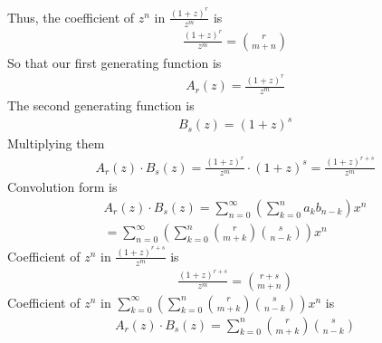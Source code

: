 ﻿\documentclass{article}
\begin{document}
    Thus, the coefficient of $z^n$ in $\frac{(1+z)^{r}}{z^m}$ is
    \begin{align*}
    [z^n]
        \frac{(1+z)^{r}}{z^m} = \binom{r}{m+n}
    \end{align*}
    So that our first generating function is
    \begin{align*}
        A_r(z) = \frac{(1+z)^{r}}{z^m}
    \end{align*}
    The second generating function is
    \begin{align*}
        B_s(z) = (1+z)^{s}
    \end{align*}
    Multiplying them
    \begin{align*}
        A_r(z) \cdot B_s(z) = \frac{(1+z)^{r}}{z^m} \cdot (1+z)^{s} = \frac{(1+z)^{r+s}}{z^m}
    \end{align*}
    Convolution form is
    \begin{align*}
        A_r(z) \cdot B_s(z) = \sum_{n=0}^{\infty} \left( \sum_{k=0}^{n} a_k b_{n-k} \right) x^n \\
        = \sum_{n=0}^{\infty} \left( \sum_{k=0}^{n} \binom{r}{m+k} \binom{s}{n-k} \right) x^n
    \end{align*}
    Coefficient of $z^n$ in $\frac{(1+z)^{r+s}}{z^m}$ is
    \begin{align*}
    [z^n]
        \frac{(1+z)^{r+s}}{z^m} = \binom{r+s}{m+n}
    \end{align*}
    Coefficient of $z^n$ in $\sum_{k=0}^{\infty} \left( \sum_{k=0}^{n} \binom{r}{m+k} \binom{s}{n-k} \right) x^n$ is
    \begin{align*}
    [z^n]
        A_r(z) \cdot B_s(z) = \sum_{k=0}^{n} \binom{r}{m+k} \binom{s}{n-k}
    \end{align*}
\end{document}
